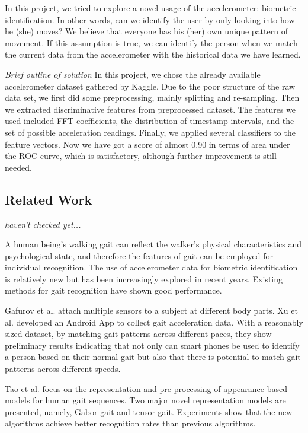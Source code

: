 \documentclass{article} %
\begin{document}
In this project, we tried to explore a novel usage of the accelerometer: biometric identification. In other words, can we identify the user by only looking into how he (she) moves? We believe that everyone has his (her) own unique pattern of movement. If this assumption is true, we can identify the person when we match the current data from the accelerometer with the historical data we have learned.

\emph{Brief outline of solution} In this project, we chose the already available accelerometer dataset gathered by Kaggle. Due to the poor structure of the raw data set, we first did some preprocessing, mainly splitting and re-sampling. Then we extracted discriminative features from preprocessed dataset. The features we used included FFT coefficients, the distribution of timestamp intervals, and the set of possible acceleration readings. Finally, we applied several  classifiers to the feature vectors. Now we have got a score of almost 0.90 in terms of area under the ROC curve, which is satisfactory, although further improvement is still needed.




\subsection{Related Work} \emph{haven't checked yet...}

A human being’s walking gait can reflect the walker’s physical characteristics and psychological state, and therefore the features of gait can be employed for individual recognition. The use of accelerometer data for biometric identification is relatively new but has been increasingly explored in recent years. Existing methods for gait recognition have shown good performance.
 
Gafurov et al. \cite{Gafurov:AIAT2007} attach multiple sensors to a subject at different body parts. Xu et al. \cite{Xu:ICB2012} developed an Android App to collect gait acceleration data. With a reasonably sized dataset, by matching gait patterns across different paces, they show preliminary results indicating that not only can smart phones be used to identify a person based on their normal gait but also that there is potential to match gait patterns across different speeds.

Tao et al.\cite{Tao:ToPAMI2007} focus on the representation and pre-processing of appearance-based models for human gait sequences. Two major novel representation models are presented, namely, Gabor gait and tensor gait. Experiments show that the new algorithms achieve better recognition rates than previous algorithms.
\end{document}
